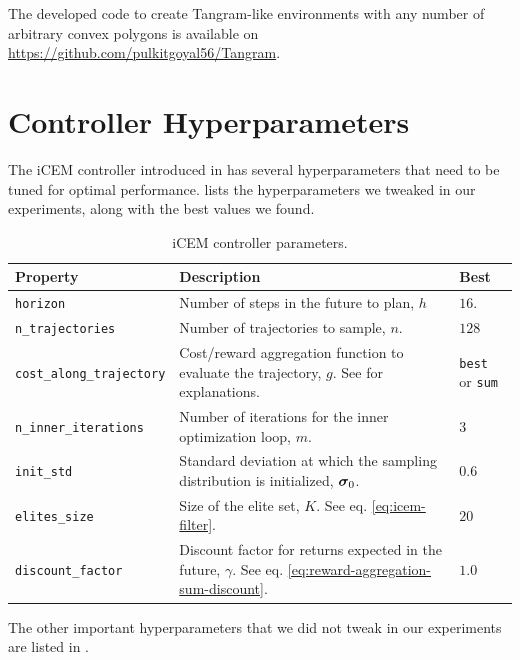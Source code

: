 The developed code to create Tangram-like environments with any number of arbitrary convex polygons is available on \url{https://github.com/pulkitgoyal56/Tangram}.

\chapter{Controller Hyperparameters}
\label{sec:icem-details}
The iCEM controller introduced in  has several hyperparameters that need to be tuned for optimal performance.
 lists the hyperparameters we tweaked in our experiments, along with the best values we found.

\begin{table}[H]
    \centering
    \caption{iCEM controller parameters.}
    \begin{tabularx}{\textwidth}{C{4.7cm} L C{2cm}}
        \hline
        Property & Description & Best\\
        \hline
        \texttt{horizon} & Number of steps in the future to plan, \(h\) & \(16\).\\
        \texttt{n\_trajectories} & Number of trajectories to sample, \(n\). & \(128\)\\
        \texttt{cost\_along\_trajectory} & Cost/reward aggregation function to evaluate the trajectory, \(g\). See  for explanations. & \texttt{best} or \texttt{sum}\\
        \texttt{n\_inner\_iterations} & Number of iterations for the inner optimization loop, \(m\). & \(3\)\\
        \texttt{init\_std} & Standard deviation at which the sampling distribution is initialized, \(\bm{\sigma}_0\). & \(0.6\)\\
        \texttt{elites\_size} & Size of the elite set, \(K\). See eq. \eqref{eq:icem-filter}. & \(20\)\\
        \texttt{discount\_factor} & Discount factor for returns expected in the future, \(\gamma\). See eq. \eqref{eq:reward-aggregation-sum-discount}. & \(1.0\)\\ 
        \hline
    \end{tabularx}
    \label{tab:icem-params}
\end{table}

The other important hyperparameters that we did not tweak in our experiments are listed in .

